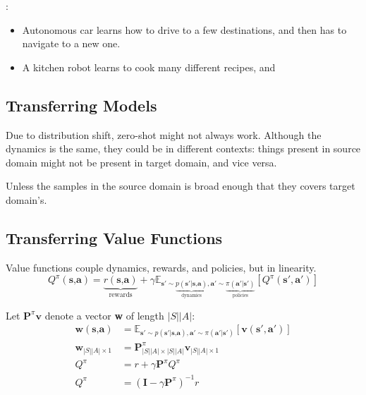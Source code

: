 \Eg:
\begin{itemize}
	\item Autonomous car learns how to drive to a few destinations, and then has to navigate to a new one.
	\item A kitchen robot learns to cook many different recipes, and
\end{itemize}

\subsection{Transferring Models}
Due to distribution shift, zero-shot might not always work. Although the dynamics is the same, they could be in different contexts: things present in source domain might not be present in target domain, and vice versa.

Unless the samples in the source domain is broad enough that they covers target domain's. 

\subsection{Transferring Value Functions}
Value functions couple dynamics, rewards, and policies, but in linearity.
\begin{equation}
	Q^\pi(\textbf{s,a}) = \underbrace{r(\textbf{s,a})}_{\textstyle \text{rewards}} + \gamma \mathbb{E}_{\textbf{s}' \sim \underbrace{p(\textbf{s}'|\textbf{s,a})}_{\textstyle \text{dynamics}}, \textbf{a}'\sim \underbrace{\pi(\textbf{a}'|\textbf{s}')}_{\textstyle \text{policies}}} [Q^\pi (\textbf{s}', \textbf{a}')]
\end{equation}

Let $\textbf{P}^\pi \textbf{v}$ denote a vector \textbf{w} of length $|S||A|$:
\begin{align}
	\textbf{w}(\textbf{s,a}) &= \mathbb{E}_{\textbf{s}' \sim p(\textbf{s}'|\textbf{s,a}), \textbf{a}'\sim \pi(\textbf{a}'|\textbf{s}')} [\textbf{v}(\textbf{s}', \textbf{a}')]\\
	\textbf{w}_{|S||A|\times 1} &= \textbf{P}^\pi_{|S||A|\times|S||A|} \textbf{v}_{|S||A|\times 1}\\
	Q^\pi &= r + \gamma \textbf{P}^\pi Q^\pi\\
	Q^\pi &= (\textbf{I} - \gamma \textbf{P}^\pi)^{-1} r
\end{align}

